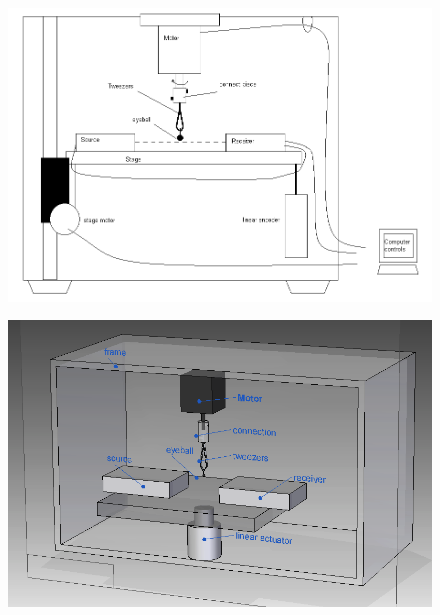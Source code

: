 \documentclass{article}
\begin{document}
\begin{figure}[h]
  \centering
  \includegraphics[width=\linewidth]{../img/schematic2}
  \label{fig:schematic2}
\end{figure}

\begin{figure}[h]
  \centering
  \includegraphics[width=\linewidth]{../img/render1}
  \label{fig:render1}
\end{figure}
\end{document}
